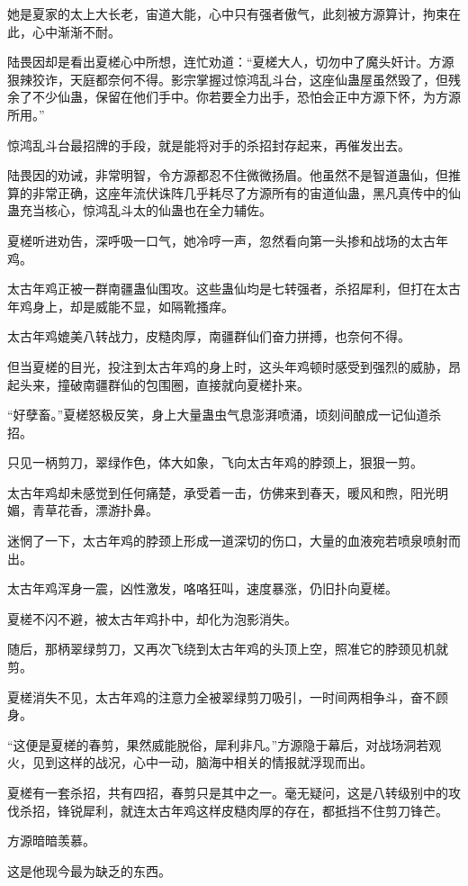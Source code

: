 \begin{this_body}
她是夏家的太上大长老，宙道大能，心中只有强者傲气，此刻被方源算计，拘束在此，心中渐渐不耐。

陆畏因却是看出夏槎心中所想，连忙劝道：“夏槎大人，切勿中了魔头奸计。方源狠辣狡诈，天庭都奈何不得。影宗掌握过惊鸿乱斗台，这座仙蛊屋虽然毁了，但残余了不少仙蛊，保留在他们手中。你若要全力出手，恐怕会正中方源下怀，为方源所用。”

惊鸿乱斗台最招牌的手段，就是能将对手的杀招封存起来，再催发出去。

陆畏因的劝诫，非常明智，令方源都忍不住微微扬眉。他虽然不是智道蛊仙，但推算的非常正确，这座年流伏诛阵几乎耗尽了方源所有的宙道仙蛊，黑凡真传中的仙蛊充当核心，惊鸿乱斗太的仙蛊也在全力辅佐。

夏槎听进劝告，深呼吸一口气，她冷哼一声，忽然看向第一头掺和战场的太古年鸡。

太古年鸡正被一群南疆蛊仙围攻。这些蛊仙均是七转强者，杀招犀利，但打在太古年鸡身上，却是威能不显，如隔靴搔痒。

太古年鸡媲美八转战力，皮糙肉厚，南疆群仙们奋力拼搏，也奈何不得。

但当夏槎的目光，投注到太古年鸡的身上时，这头年鸡顿时感受到强烈的威胁，昂起头来，撞破南疆群仙的包围圈，直接就向夏槎扑来。

“好孽畜。”夏槎怒极反笑，身上大量蛊虫气息澎湃喷涌，顷刻间酿成一记仙道杀招。

只见一柄剪刀，翠绿作色，体大如象，飞向太古年鸡的脖颈上，狠狠一剪。

太古年鸡却未感觉到任何痛楚，承受着一击，仿佛来到春天，暖风和煦，阳光明媚，青草花香，漂游扑鼻。

迷惘了一下，太古年鸡的脖颈上形成一道深切的伤口，大量的血液宛若喷泉喷射而出。

太古年鸡浑身一震，凶性激发，咯咯狂叫，速度暴涨，仍旧扑向夏槎。

夏槎不闪不避，被太古年鸡扑中，却化为泡影消失。

随后，那柄翠绿剪刀，又再次飞绕到太古年鸡的头顶上空，照准它的脖颈见机就剪。

夏槎消失不见，太古年鸡的注意力全被翠绿剪刀吸引，一时间两相争斗，奋不顾身。

“这便是夏槎的春剪，果然威能脱俗，犀利非凡。”方源隐于幕后，对战场洞若观火，见到这样的战况，心中一动，脑海中相关的情报就浮现而出。

夏槎有一套杀招，共有四招，春剪只是其中之一。毫无疑问，这是八转级别中的攻伐杀招，锋锐犀利，就连太古年鸡这样皮糙肉厚的存在，都抵挡不住剪刀锋芒。

方源暗暗羡慕。

这是他现今最为缺乏的东西。


\end{this_body}
